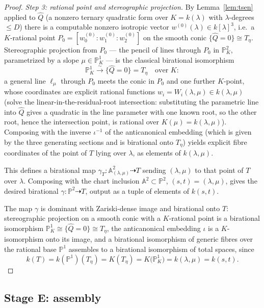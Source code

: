 \documentclass{amsart}
\theoremstyle{plain}
\theoremstyle{definition}
\newcommand{\PP}{\mathbb{P}}
\newcommand{\AA}{\mathbb{A}}
\begin{document}
\begin{proof}
\smallskip
\emph{Step 3: rational point and stereographic projection.}
By Lemma~\ref{lem:tsen} applied to $\widehat Q$ (a nonzero ternary quadratic form
over $K=k(\lambda)$ with $\lambda$-degrees $\le D$) there is a computable nonzero
isotropic vector $w^{(0)}(\lambda)\in k[\lambda]^3$, i.e.\ a $K$-rational point
$P_0=[w_0^{(0)}:w_1^{(0)}:w_2^{(0)}]$ on the smooth conic $\{\widehat Q=0\}\cong
T_\eta$.  Stereographic projection from $P_0$ — the pencil of lines through $P_0$
in $\PP^2_K$, parametrized by a slope $\mu\in\PP^1_K$ — is the classical
birational isomorphism
\[
\PP^1_K\xrightarrow{\ \sim\ }\{\widehat Q=0\}=T_\eta\quad\text{over }K :
\]
a general line $\ell_\mu$ through $P_0$ meets the conic in $P_0$ and one further
$K$-point, whose coordinates are explicit rational functions
$w_i=W_i(\lambda,\mu)\in k(\lambda,\mu)$ (solve the linear-in-the-residual-root
intersection: substituting the parametric line into $\widehat Q$ gives a
quadratic in the line parameter with one known root, so the other root, hence the
intersection point, is rational over $K(\mu)=k(\lambda,\mu)$).  Composing with
the inverse $\iota^{-1}$ of the anticanonical embedding (which is given by the
three generating sections and is birational onto $T_\eta$) yields explicit fibre
coordinates of the point of $T$ lying over $\lambda$, as elements of
$k(\lambda,\mu)$.

This defines a birational map
$\gamma_T\colon\AA^2_{(\lambda,\mu)}\dashrightarrow T$ sending $(\lambda,\mu)$ to
that point of $T$ over $\lambda$.  Composing with the chart inclusion
$\AA^2\subset\PP^2$, $(s,t)=(\lambda,\mu)$, gives the desired birational
$\gamma\colon\PP^2\dashrightarrow T$, output as a tuple of elements of $k(s,t)$.

The map $\gamma$ is dominant with Zariski-dense image and birational onto $T$:
stereographic projection on a smooth conic with a $K$-rational point is a
birational isomorphism $\PP^1_K\cong\{\widehat Q=0\}\cong T_\eta$, the
anticanonical embedding $\iota$ is a $K$-isomorphism onto its image, and a
birational isomorphism of generic fibres over the rational base $\PP^1$ assembles
to a birational isomorphism of total spaces, since
\[
k(T)=k(\PP^1)(T_\eta)=K(T_\eta)=K\bigl(\PP^1_K\bigr)=k(\lambda,\mu)=k(s,t).
\]

\end{proof}

\subsection{Stage E: assembly}
\end{document}
